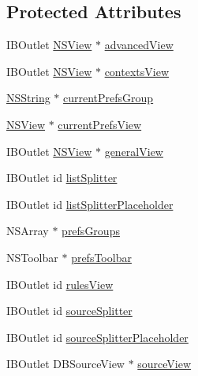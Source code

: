 \subsection*{Protected Attributes}
\begin{CompactItemize}
\item 
IBOutlet \hyperlink{class_n_s_view}{NSView} $\ast$ \hyperlink{interface_c_m_window_controller_a673b337109398fa2b8e138fe9f08224}{advancedView}
\item 
IBOutlet \hyperlink{class_n_s_view}{NSView} $\ast$ \hyperlink{interface_c_m_window_controller_2e4a8415c4a28ff7638696cb4b650161}{contextsView}
\item 
\hyperlink{class_n_s_string}{NSString} $\ast$ \hyperlink{interface_c_m_window_controller_dc91051bebb3076d4484530e736622ca}{currentPrefsGroup}
\item 
\hyperlink{class_n_s_view}{NSView} $\ast$ \hyperlink{interface_c_m_window_controller_7e4bdab922f64da0ae1c66ff5a8f538a}{currentPrefsView}
\item 
IBOutlet \hyperlink{class_n_s_view}{NSView} $\ast$ \hyperlink{interface_c_m_window_controller_0208b15d4c7cc22d9b04f66eef0173ed}{generalView}
\item 
IBOutlet id \hyperlink{interface_c_m_window_controller_110a03075bf89edcf25208d579cc0374}{listSplitter}
\item 
IBOutlet id \hyperlink{interface_c_m_window_controller_8924cca99f80e7b215068a23d375edce}{listSplitterPlaceholder}
\item 
NSArray $\ast$ \hyperlink{interface_c_m_window_controller_d5dd5cafd76b4d008e0ddbc92b928e1b}{prefsGroups}
\item 
NSToolbar $\ast$ \hyperlink{interface_c_m_window_controller_5e33dd8ae9308216fe56beab45097ec7}{prefsToolbar}
\item 
IBOutlet id \hyperlink{interface_c_m_window_controller_dd05105cac35dbf0b02c10086e183fdd}{rulesView}
\item 
IBOutlet id \hyperlink{interface_c_m_window_controller_e1c749543503661c7956761c6f10b95f}{sourceSplitter}
\item 
IBOutlet id \hyperlink{interface_c_m_window_controller_7c3e1c39774afa7401869ed51460e7c3}{sourceSplitterPlaceholder}
\item 
IBOutlet DBSourceView $\ast$ \hyperlink{interface_c_m_window_controller_0534aae4f0512cb2da96464157f04b75}{sourceView}
\end{CompactItemize}


